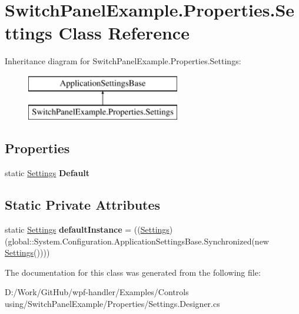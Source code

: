 \hypertarget{class_switch_panel_example_1_1_properties_1_1_settings}{}\section{Switch\+Panel\+Example.\+Properties.\+Settings Class Reference}
\label{class_switch_panel_example_1_1_properties_1_1_settings}
Inheritance diagram for Switch\+Panel\+Example.\+Properties.\+Settings\+:\begin{figure}[H]
\begin{center}
\leavevmode
\includegraphics[height=2.000000cm]{df/d35/class_switch_panel_example_1_1_properties_1_1_settings}
\end{center}
\end{figure}
\subsection*{Properties}
\begin{DoxyCompactItemize}
\item 
\mbox{\label{class_switch_panel_example_1_1_properties_1_1_settings_a15247e355fedbad7db5ecd7d80dba4d6}} 
static \mbox{\hyperlink{class_switch_panel_example_1_1_properties_1_1_settings}{Settings}} {\bfseries Default}
\end{DoxyCompactItemize}
\subsection*{Static Private Attributes}
\begin{DoxyCompactItemize}
\item 
\mbox{\label{class_switch_panel_example_1_1_properties_1_1_settings_a977a9ebbdbf69f85f9320ac017cf50c9}} 
static \mbox{\hyperlink{class_switch_panel_example_1_1_properties_1_1_settings}{Settings}} {\bfseries default\+Instance} = ((\mbox{\hyperlink{class_switch_panel_example_1_1_properties_1_1_settings}{Settings}})(global\+::\+System.\+Configuration.\+Application\+Settings\+Base.\+Synchronized(new \mbox{\hyperlink{class_switch_panel_example_1_1_properties_1_1_settings}{Settings}}())))
\end{DoxyCompactItemize}


The documentation for this class was generated from the following file\+:\begin{DoxyCompactItemize}
\item 
D\+:/\+Work/\+Git\+Hub/wpf-\/handler/\+Examples/\+Controls using/\+Switch\+Panel\+Example/\+Properties/Settings.\+Designer.\+cs\end{DoxyCompactItemize}
